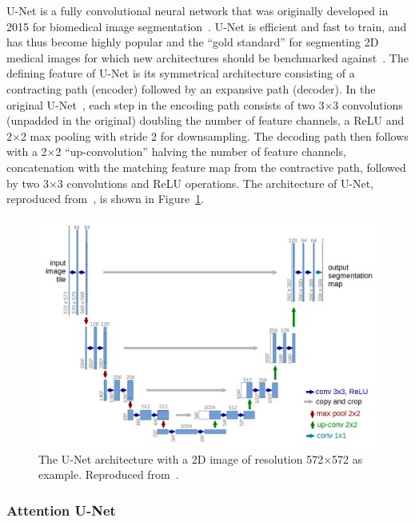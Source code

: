 U-Net is a fully convolutional neural network that was originally developed in 2015 for biomedical image segmentation~\cite{Ronneberger_Fischer_Brox_2015}. U-Net is efficient and fast to train, and has thus become highly popular and the \enquote{gold standard} for segmenting 2D medical images for which new architectures should be benchmarked against~\cite{Sengara_2022}. The defining feature of U-Net is its symmetrical architecture consisting of a contracting path (encoder) followed by an expansive path (decoder). In the original U-Net~\cite{Ronneberger_Fischer_Brox_2015}, each step in the encoding path consists of two 3$\times$3 convolutions (unpadded in the original) doubling the number of feature channels, a ReLU and 2$\times$2 max pooling with stride 2 for downsampling. The decoding path then follows with a 2$\times$2 \enquote{up-convolution} halving the number of feature channels, concatenation with the matching feature map from the contractive path, followed by two 3$\times$3 convolutions and ReLU operations. The architecture of U-Net, reproduced from~\cite{Ronneberger_Fischer_Brox_2015}, is shown in Figure~\ref{fig:unet_arch}.

\begin{figure}
    \centering
    \includegraphics[width=1\linewidth]{media/images/UNet_arch.png}
    \caption{The U-Net architecture with a 2D image of resolution 572$\times$572 as example. Reproduced from~\cite{Ronneberger_Fischer_Brox_2015}.}
    \label{fig:unet_arch}
  \end{figure}

\subsubsection{Attention U-Net}

